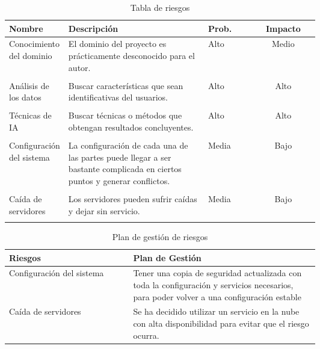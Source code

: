 \begin{table}[h]
    \centering
    \begin{tabular}{p{0.15\linewidth} p{0.45\linewidth} l c}
        \toprule
        Nombre                    & Descripción & Prob. & Impacto\\
        \midrule
        Conocimiento del dominio &  El dominio del proyecto es prácticamente desconocido para el autor. & Alto & Medio \\ \\
        
        Análisis de los datos  & Buscar características que sean identificativas del usuarios.  & Alto & Alto \\ \\
        
        Técnicas de IA  & Buscar técnicas o métodos que obtengan resultados concluyentes. & Alto & Alto \\ \\
        
        Configuración del sistema &  La configuración de cada una de las partes puede llegar a ser bastante complicada en ciertos puntos y generar conflictos. & Media  &  Bajo \\ \\
        
        Caída de servidores & Los servidores pueden sufrir caídas y dejar sin servicio.  & Media  &  Bajo \\ \\
        
        \bottomrule
    \end{tabular}
    \caption{Tabla de riesgos}
    \label{tab:riesgos}
\end{table}


\begin{table}[h]
    \centering
    \begin{tabular}{ l p{0.6\linewidth}}
         \toprule
         Riesgos & Plan de Gestión \\
         \midrule
          Configuración del sistema &  Tener una copia de seguridad actualizada con toda la configuración y servicios necesarios, para poder volver a una configuración estable \\
          Caída de servidores & Se ha decidido utilizar un servicio en la nube con alta disponibilidad para evitar que el riesgo ocurra.\\
         \bottomrule
    \end{tabular}
    \caption{Plan de gestión de riesgos}
    \label{tab:contingencia}
\end{table}

